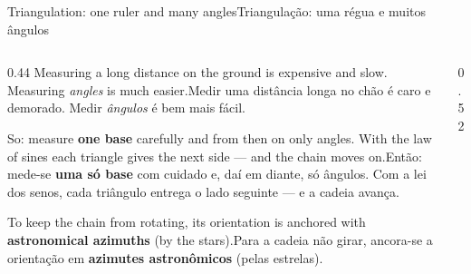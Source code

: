 \documentclass[aspectratio=169,11pt]{beamer}
\newcommand{\tr}[2]{\ifEN#2\else#1\fi}
\newcommand{\bnum}[1]{\ifmmode\textcolor{mTeal}{\mathbf{#1}}\else\textbf{\textcolor{mTeal}{#1}}\fi}
\begin{document}
\begin{frame}{\tr{Triangulação: uma régua e muitos ângulos}{Triangulation: one ruler and many
    angles}}
  \begin{columns}[T]
    \begin{column}{0.44\textwidth}
      \small
      \tr{Medir uma distância longa no chão é caro e demorado. Medir \emph{ângulos} é bem
      mais fácil.}{Measuring a long distance on the ground is expensive and slow. Measuring
      \emph{angles} is much easier.}
      \medskip

      \tr{Então: mede-se \bnum{uma só base} com cuidado e, daí em diante, só ângulos. Com a lei
      dos senos, cada triângulo entrega o lado seguinte --- e a cadeia avança.}{So: measure
      \bnum{one base} carefully and from then on only angles. With the law of sines each
      triangle gives the next side --- and the chain moves on.}
      \medskip

      \tr{Para a cadeia não girar, ancora-se a orientação em \textbf{azimutes astronômicos}
      (pelas estrelas).}{To keep the chain from rotating, its orientation is anchored with
      \textbf{astronomical azimuths} (by the stars).}
    \end{column}
    \begin{column}{0.52\textwidth}
      \centering
    \end{column}
  \end{columns}
\end{frame}
\end{document}
